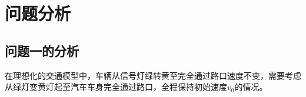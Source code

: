 \documentclass[withoutpreface,bwprint]{cumcmthesis}
\begin{document}

\section{问题分析}
% 
% 
\subsection{问题一的分析}
在理想化的交通模型中，车辆从信号灯绿转黄至完全通过路口速度不变，需要考虑从绿灯变黄灯起至汽车车身完全通过路口，全程保持初始速度$v_0$的情况。
\end{document}

